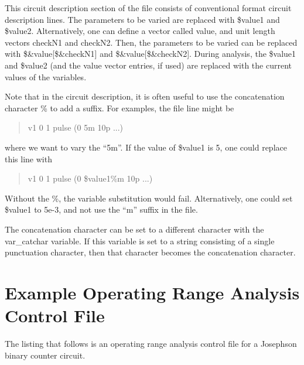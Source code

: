 This circuit description section of the file consists of conventional
{\WRspice} format circuit description lines.  The parameters to be
varied are replaced with {\vt \$value1} and {\vt \$value2}. 
Alternatively, one can define a vector called {\et value}, and unit
length vectors {\et checkN1} and {\et checkN2}.  Then, the parameters
to be varied can be replaced with {\vt \$\&value[\$\&checkN1]} and
{\vt \$\&value[\$\&checkN2]}.  During analysis, the {\vt \$value1} and
{\vt \$value2} (and the value vector entries, if used) are replaced
with the current values of the variables.

Note that in the circuit description, it is often useful to use the
concatenation character {\vt \%} to add a suffix.  For examples, the file
line might be
\begin{quote}
{\vt v1 0 1 pulse (0 5m 10p ...)}
\end{quote}
where we want to vary the ``{\vt 5m}''.  If the value of {\vt \$value1}
is 5, one
could replace this line with
\begin{quote}
{\vt v1 0 1 pulse (0 \$value1\%m 10p ...)}
\end{quote}

Without the {\vt \%}, the variable substitution would fail.  Alternatively,
one could set {\vt \$value1} to 5e-3, and not use the ``{\vt m}'' suffix
in the file.

The concatenation character can be set to a different character with
the {\et var\_catchar} variable.  If this variable is set to a string
consisting of a single punctuation character, then that character
becomes the concatenation character.


\section{Example Operating Range Analysis Control File}


The listing that follows is an operating range analysis control file
for a Josephson binary counter circuit.

